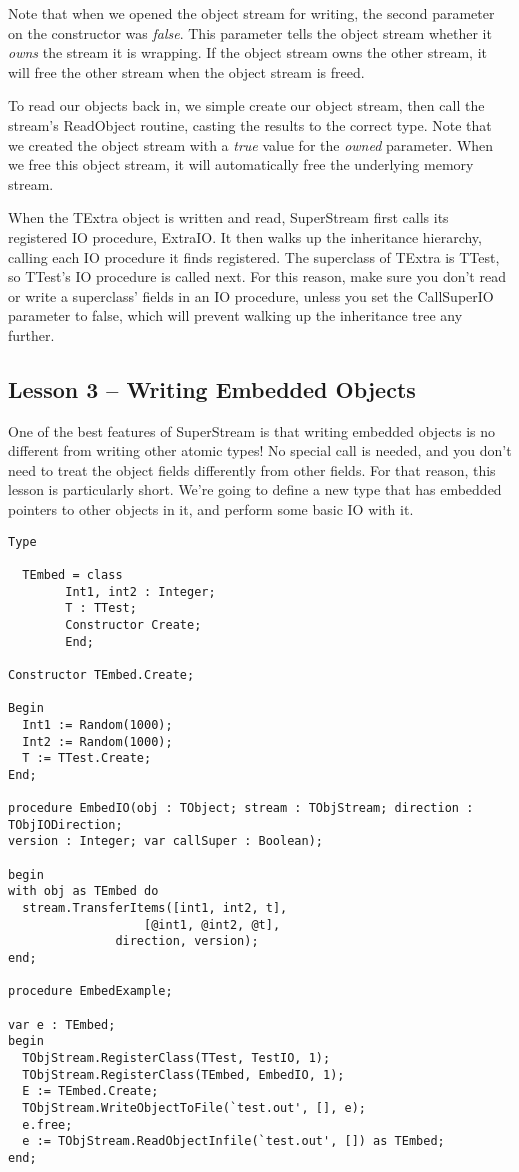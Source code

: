 \documentclass{report}
\begin{document}
Note that when we opened the object stream for writing, the second parameter
on the constructor was \emph{false}. This parameter tells the object stream
whether it \emph{owns } the stream it is wrapping. If the object stream owns
the other stream, it will free the other stream when the object stream is
freed.

To read our objects back in, we simple create our object stream, then call
the stream's ReadObject routine, casting the results to the correct type. 
Note that we created the object stream with a \emph{true } value for the
\emph{owned } parameter. When we free this object stream, it will
automatically free the underlying memory stream.

When the TExtra object is written and read, SuperStream first calls its
registered IO procedure, ExtraIO. It then walks up the inheritance
hierarchy, calling each IO procedure it finds registered. The superclass of
TExtra is TTest, so TTest's IO procedure is called next. For this reason,
make sure you don't read or write a superclass' fields in an IO procedure,
unless you set the CallSuperIO parameter to false, which will prevent
walking up the inheritance tree any further.

\subsection{Lesson 3 -- Writing Embedded Objects}

One of the best features of SuperStream is that writing embedded objects is
no different from writing other atomic types! No special call is needed, and
you don't need to treat the object fields differently from other fields. For
that reason, this lesson is particularly short.
We're going to define a new type that has embedded pointers to 
other objects in it, and
perform some basic IO with it.

\begin{lstlisting}
Type

  TEmbed = class
	    Int1, int2 : Integer;
	    T : TTest;
	    Constructor Create;
   	    End;

Constructor TEmbed.Create;

Begin
  Int1 := Random(1000);
  Int2 := Random(1000);
  T := TTest.Create;
End;

procedure EmbedIO(obj : TObject; stream : TObjStream; direction : TObjIODirection;
version : Integer; var callSuper : Boolean);

begin
with obj as TEmbed do
  stream.TransferItems([int1, int2, t],
	               [@int1, @int2, @t],
		       direction, version);
end;

procedure EmbedExample;

var e : TEmbed;
begin
  TObjStream.RegisterClass(TTest, TestIO, 1);
  TObjStream.RegisterClass(TEmbed, EmbedIO, 1);
  E := TEmbed.Create;
  TObjStream.WriteObjectToFile(`test.out', [], e);
  e.free;
  e := TObjStream.ReadObjectInfile(`test.out', []) as TEmbed;
end;
\end{lstlisting}
\end{document}
